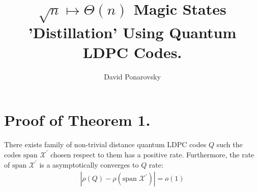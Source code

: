 \documentclass[manuscript,screen,review]{acmart}
\begin{document}

\title{ $\sqrt{n} \mapsto \Theta(n)$  Magic States 'Distillation' Using
Quantum LDPC Codes. }
\author{David Ponarovsky}
\maketitle

\newcommand*{\Mbas}{\mathcal{X}^\prime}
\newcommand*{\sMbas}{\text{span }\Mbas}
\newcommand*{\QQ}{C_{X}/C_{Z}^\perp }
\newcommand*{\trig}{Triorthogonal }
\newcommand*{\Hyp}{Hyperproduct }
\newcommand*{\Cin}{ C_{\text{initial}} }
\newcommand*{\Ctan}{ C_{\text{Tanner}} }




\section{Proof of Theorem 1.}
\begin{claim}
  \label{claim:notempty}
  There exists family of non-trivial distance quantum LDPC codes $Q$ such the codes $\sMbas$ chosen respect to them has a positive rate. Furthermore, the rate of $\sMbas$ is a asymptotically converges to $Q$ rate:
  \begin{equation*}
    \begin{split}
      \left| \rho\left(Q\right) - \rho\left(\sMbas\right) \right| = o(1)
    \end{split}
  \end{equation*}
\end{claim}
\end{document}
